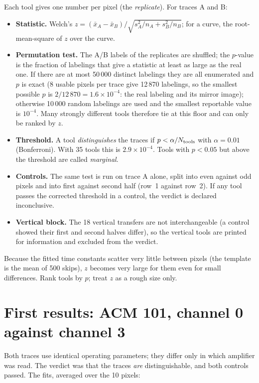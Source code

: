 \documentclass[11pt]{article}
\begin{document}
Each tool gives one number per pixel (the \emph{replicate}). For traces A and B:
\begin{itemize}
  \item \textbf{Statistic.} Welch's $z=(\bar x_A-\bar x_B)/\sqrt{s_A^2/n_A+s_B^2/n_B}$; for a curve, the
        root-mean-square of $z$ over the curve.
  \item \textbf{Permutation test.} The A/B labels of the replicates are shuffled; the $p$-value is the
        fraction of labelings that give a statistic at least as large as the real one. If there are at most 50\,000 distinct
        labelings they are all enumerated and $p$ is exact (8 usable pixels per trace give 12\,870 labelings, so the smallest possible
        $p$ is $2/12\,870=1.6\times10^{-4}$: the real labeling and its mirror image); otherwise 10\,000 random labelings are used and
        the smallest reportable value is $10^{-4}$. Many strongly different tools therefore tie at this floor and can only be
        ranked by $z$.
  \item \textbf{Threshold.} A tool \emph{distinguishes} the traces if $p<\alpha/N_{\rm tools}$ with
        $\alpha=0.01$ (Bonferroni). With 35 tools this is $2.9\times10^{-4}$. Tools with $p<0.05$ but above
        the threshold are called \emph{marginal}.
  \item \textbf{Controls.} The same test is run on trace A alone, split into even against odd pixels and into
        first against second half (row~1 against row~2). If any tool passes the corrected threshold in a
        control, the verdict is declared inconclusive.
  \item \textbf{Vertical block.} The 18 vertical transfers are not interchangeable (a control showed their first
        and second halves differ), so the vertical tools are printed for information and excluded from the
        verdict.
\end{itemize}
Because the fitted time constants scatter very little between pixels (the template is the mean of 500 skips),
$z$ becomes very large for them even for small differences. Rank tools by $p$; treat $z$ as a rough size only.

\section{First results: ACM 101, channel 0 against channel 3}
\label{sec:results}

Both traces use identical operating parameters; they differ only in which amplifier was read. The verdict was
that the traces \emph{are} distinguishable, and both controls passed. The fits, averaged over the 10 pixels:
\end{document}
